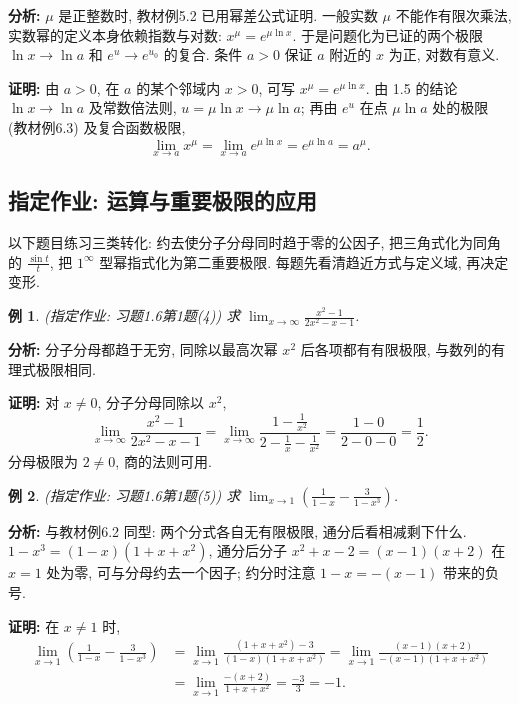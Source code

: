 \documentclass[UTF8,openany]{ctexbook}
\theoremstyle{chinesetextbook}
\newtheorem{example}{例}[section]
\newenvironment{cnproof}{\par\indent\textbf{证明:} \ignorespaces}{\par}
\begin{document}
\par\indent\textbf{分析:} $\mu$ 是正整数时, 教材例5.2 已用幂差公式证明. 一般实数 $\mu$ 不能作有限次乘法, 实数幂的定义本身依赖指数与对数: $x^\mu=e^{\mu\ln x}$. 于是问题化为已证的两个极限 $\ln x\to\ln a$ 和 $e^u\to e^{u_0}$ 的复合. 条件 $a>0$ 保证 $a$ 附近的 $x$ 为正, 对数有意义.
\begin{cnproof}
由 $a>0$, 在 $a$ 的某个邻域内 $x>0$, 可写 $x^\mu=e^{\mu\ln x}$. 由 1.5 的结论 $\ln x\to\ln a$ 及常数倍法则, $u=\mu\ln x\to\mu\ln a$; 再由 $e^u$ 在点 $\mu\ln a$ 处的极限 (教材例6.3) 及复合函数极限,
\[
\lim_{x\to a}x^\mu=\lim_{x\to a}e^{\mu\ln x}=e^{\mu\ln a}=a^\mu.
\]
\end{cnproof}

\subsection{指定作业: 运算与重要极限的应用}
以下题目练习三类转化: 约去使分子分母同时趋于零的公因子, 把三角式化为同角的 $\displaystyle\frac{\sin t}t$, 把 $1^\infty$ 型幂指式化为第二重要极限. 每题先看清趋近方式与定义域, 再决定变形.
\begin{example}
\textnormal{(指定作业: 习题1.6第1题(4))} 求 $\displaystyle \lim_{x\to\infty}\frac{x^2-1}{2x^2-x-1}$.
\end{example}
\par\indent\textbf{分析:} 分子分母都趋于无穷, 同除以最高次幂 $x^2$ 后各项都有有限极限, 与数列的有理式极限相同.
\begin{cnproof}
对 $x\ne0$, 分子分母同除以 $x^2$,
\[
\lim_{x\to\infty}\frac{x^2-1}{2x^2-x-1}
=\lim_{x\to\infty}\frac{1-\frac1{x^2}}{2-\frac1x-\frac1{x^2}}
=\frac{1-0}{2-0-0}=\frac12.
\]
分母极限为 $2\ne0$, 商的法则可用.
\end{cnproof}
\begin{example}
\textnormal{(指定作业: 习题1.6第1题(5))} 求 $\displaystyle \lim_{x\to1}\left(\frac1{1-x}-\frac3{1-x^3}\right)$.
\end{example}
\par\indent\textbf{分析:} 与教材例6.2 同型: 两个分式各自无有限极限, 通分后看相减剩下什么. $1-x^3=(1-x)(1+x+x^2)$, 通分后分子 $x^2+x-2=(x-1)(x+2)$ 在 $x=1$ 处为零, 可与分母约去一个因子; 约分时注意 $1-x=-(x-1)$ 带来的负号.
\begin{cnproof}
在 $x\ne1$ 时,
\[
\begin{aligned}
\lim_{x\to1}\left(\frac1{1-x}-\frac3{1-x^3}\right)
&=\lim_{x\to1}\frac{(1+x+x^2)-3}{(1-x)(1+x+x^2)}
=\lim_{x\to1}\frac{(x-1)(x+2)}{-(x-1)(1+x+x^2)}\\
&=\lim_{x\to1}\frac{-(x+2)}{1+x+x^2}=\frac{-3}{3}=-1.
\end{aligned}
\]
\end{cnproof}
\end{document}
